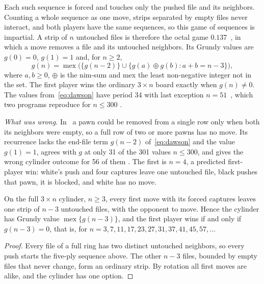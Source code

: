Each such sequence is forced and touches only the pushed file and its neighbors. Counting a whole sequence as
one move, strips separated by empty files never interact, and both players have the same sequences, so this
game of sequences is impartial. A strip of $n$ untouched files is therefore the octal game $\mathbf{0.137}$~\cite{GuySmith1956,WinningWays},
in which a move removes a file and its untouched neighbors. Its Grundy values are $g(0)=0$, $g(1)=1$ and,
for $n\ge2$,
\begin{equation}\label{eq:dawson}
g(n)=\operatorname{mex}\bigl(\{g(n-2)\}\cup\{g(a)\oplus g(b) : a+b=n-3\}\bigr),
\end{equation}
where $a,b\ge0$, $\oplus$ is the nim-sum and mex the least non-negative integer not in the set. The first
player wins the ordinary $3\times n$ board exactly when $g(n)\ne0$. The values from~\eqref{eq:dawson}
have period 34 with last exception $n=51$~\cite{GuySmith1956}, which two programs reproduce for $n\le300$
.

\emph{What was wrong.} In~\cite{Study2025} a pawn could be removed from a single row only when
both its neighbors were empty, so a full row of two or more pawns has no move. Its recurrence lacks the
end-file term $g(n-2)$ of~\eqref{eq:dawson} and the value $g(1)=1$, agrees with $g$ at only 31 of the 301 values
$n\le300$, and gives the wrong cylinder outcome for 56 of them . The first is $n=4$, a predicted
first-player win: white's push and four captures leave one untouched file, black pushes that pawn, it is
blocked, and white has no move.

\begin{theorem}\label{thm:ring}
On the full $3\times n$ cylinder, $n\ge3$, every first move with its forced captures leaves one strip of
$n-3$ untouched files, with the opponent to move. Hence the cylinder has Grundy value
$\operatorname{mex}\{g(n-3)\}$, and the first player wins if and only if $g(n-3)=0$, that is, for
$n=3,7,11,17,23,27,31,37,41,45,57,\dots$
\end{theorem}

\begin{proof}
Every file of a full ring has two distinct untouched neighbors, so every push starts the five-ply sequence
above. The other $n-3$ files, bounded by empty files that never change, form an ordinary strip. By
rotation all first moves are alike, and the cylinder has one option.
\end{proof}

